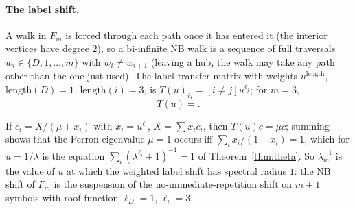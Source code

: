 \paragraph{The label shift.}
A walk in $F_m$ is forced through each path once it has entered it (the interior vertices have degree $2$), so a bi-infinite NB walk is a sequence of full traversals $w_i\in\{D,1,\dots,m\}$ with $w_i\ne w_{i+1}$ (leaving a hub, the walk may take any path other than the one just used). The label transfer matrix with weights $u^{\mathrm{length}}$, $\mathrm{length}(D)=1$, $\mathrm{length}(i)=3$, is $T(u)_{ij}=[i\ne j]u^{\ell_j}$; for $m=3$,
\[
T(u)=.
\]
\begin{remark}\label{rem:T}
If $c_i=X/(\mu+x_i)$ with $x_i=u^{\ell_i}$, $X=\sum x_ic_i$, then $T(u)c=\mu c$; summing shows that the Perron eigenvalue $\mu=1$ occurs iff $\sum_ix_i/(1+x_i)=1$, which for $u=1/\lambda$ is the equation $\sum_i(\lambda^{\ell_i}+1)^{-1}=1$ of Theorem~\ref{thm:theta}. So $\lambda_m^{-1}$ is the value of $u$ at which the weighted label shift has spectral radius $1$: the NB shift of $F_m$ is the suspension of the no-immediate-repetition shift on $m+1$ symbols with roof function $\ell_D=1$, $\ell_i=3$.
\end{remark}

